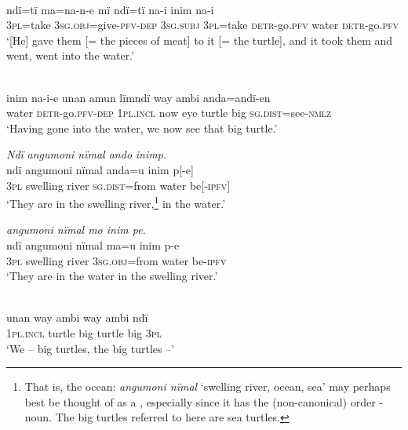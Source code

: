 \ex {}\\
\gll ndï=tï ma=na-n-e          mï      ndï=tï na-i inim  na-i\\
3\textsc{pl}=take  3\textsc{sg.obj}=give-\textsc{pfv-dep}  \textsc{3sg.subj}  \textsc{3pl}=take  \textsc{detr-}go.\textsc{pfv} water  \textsc{detr-}go.\textsc{pfv}\\
\glt ‘[He] gave them [= the pieces of meat] to it [= the turtle], and it took them and went, went into the water.’

\ex {}\\
\gll inim  na{{}-i-e} u{n}a{n} {a}mun  {l}ïmndï  way  ambi {a}nda{=andï-en}\\
water  \textsc{detr-}go.\textsc{pfv-dep}  \textsc{1pl.incl}  now  eye    turtle  big \textsc{sg.dist}=see-\textsc{nmlz}\\
\glt ‘Having gone into the water, we now see that big turtle.’

\ex \negmedspace \textit{Nd}{\textit{ï}} \textit{ang}{\textit{u}}\textit{mo}{\textit{ni nïmal ando}} \textit{inimp.}\\
\gll nd{ï} ang{u}moni  nïmal  anda=u inim p[-e]\\
3\textsc{pl}  swelling  river  \textsc{sg.dist}=from  water  be[-\textsc{ipfv]}\\
\glt ‘They are in the swelling river,\footnote{That is, the ocean: \textit{angumoni nïmal} ‘swelling river, ocean, sea’ may perhaps best be thought of as a , especially since it has the (non-canonical) order -noun. The big turtles referred to here are sea turtles.} in the water.’

\ex {} {\textit{ang}}{\textit{u}}{\textit{mon}}{\textit{i nï}}{\textit{mal mo inim pe.}}\\
\gll nd{ï} ang{u}moni  nïmal  ma=u      inim  p-e\\
3\textsc{pl}  swelling  river  3\textsc{sg.obj=}from  water  be-\textsc{ipfv}\\
\glt ‘They are in the water in the swelling river.’

\newpage

\ex {}\\
\gll unan way  ambi  way  ambi  ndï\\
1\textsc{pl.incl}  turtle  big    turtle  big    3\textsc{pl}\\
\glt ‘We -- big turtles, the big turtles --’

